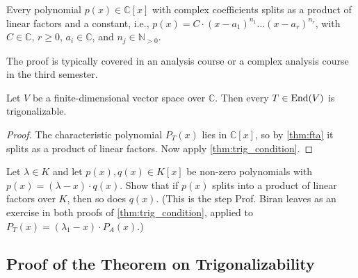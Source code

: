 \begin{theorem} \label{thm:fta}
  Every polynomial $p(x) \in \mathbb{C}[x]$ with complex coefficients splits as a product of linear factors and a constant, i.e.,
  $p(x) = C \cdot (x-a_1)^{n_1} \dots (x-a_r)^{n_r}$, with $C \in \mathbb{C}$, $r \ge 0$, $a_i \in \mathbb{C}$, and $n_j \in \mathbb{N}_{>0}$.
\end{theorem}

\begin{remark}\label{rem:fta_proof}
  The proof is typically covered in an analysis course or a complex analysis course in the third semester.
\end{remark}

\begin{corollary}\label{cor:complex_trigonalizable}
  Let $V$ be a finite-dimensional vector space over $\mathbb{C}$. Then every $T \in \operatorname{End}(V)$ is trigonalizable.
\end{corollary}

\begin{proof}
  The characteristic polynomial $P_T(x)$ lies in $\mathbb{C}[x]$, so by \cref{thm:fta} it splits as a product of linear factors. Now apply \cref{thm:trig_condition}.
\end{proof}

\begin{exercise}\label{ex:factor_splits}
  Let $\lambda \in K$ and let $p(x), q(x) \in K[x]$ be non-zero polynomials with $p(x) = (\lambda - x) \cdot q(x)$. Show that if $p(x)$ splits into a product of linear factors over $K$, then so does $q(x)$.
  (This is the step Prof. Biran leaves as an exercise in both proofs of \cref{thm:trig_condition}, applied to $P_T(x) = (\lambda_1 - x) \cdot P_A(x)$.)
\end{exercise}

\subsection{Proof of the Theorem on Trigonalizability}

